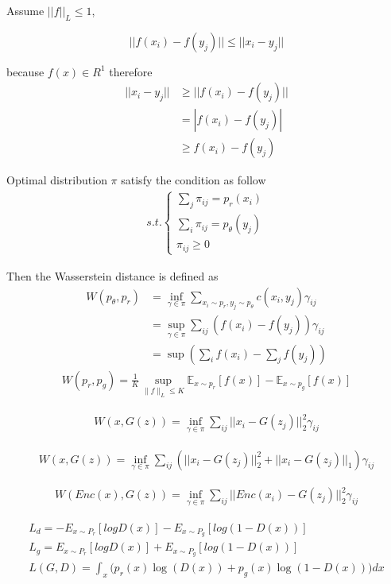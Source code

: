 \documentclass[letterpaper]{article} %
\begin{document}
	Assume $||f||_L \le 1 $,
	
	$$||f(x_i) - f(y_j)|| \le ||x_i-y_j||$$
	
	because $f(x) \in R^1$
	therefore
	\begin{align*}
	||x_i-y_j|| &\ge ||f(x_i) - f(y_j)|| \\
	&= |f(x_i)-f(y_j)| \\
	& \ge f(x_i) - f(y_j)
	\end{align*}
	
	Optimal distribution $\pi$ satisfy the condition as follow
	\begin{align*}
	s.t.
	\begin{cases}
	\sum_j\pi_{ij} = p_r(x_i) \\
	\sum_i\pi_{ij} = p_\theta(y_j) \\
	\pi_{ij} \ge 0
	\end{cases}
	\end{align*}
	
	Then the Wasserstein distance is defined as
	\begin{align*}
	W(p_\theta,p_r) &= \inf_{\gamma\in \pi} \sum_{x_i\sim p_r,y_j\sim p_\theta} c(x_i,y_j)\gamma_{ij} \\
	&=\sup_{\gamma\in \pi} \sum_{ij} (f(x_i) - f(y_j))\gamma_{ij}\\
	&=\sup (\sum_if(x_i) - \sum_jf(y_j))
	\end{align*}
	\begin{align*}
	W(p_r, p_g) = \frac{1}{K} \sup_{\| f \|_L \leq K} \mathbb{E}_{x \sim p_r}[f(x)] - \mathbb{E}_{x \sim p_g}[f(x)]
	\end{align*}
	
	
	\begin{align*}
	W(x,G(z)) = \inf_{\gamma\in \pi}\sum_{ij}||x_i-G(z_j)||^2_2\gamma_{ij}
	\end{align*}
	
	\begin{align*}
	W(x,G(z)) = \inf_{\gamma\in \pi}\sum_{ij}(||x_i-G(z_j)||^2_2 + ||x_i-G(z_j)||_1)\gamma_{ij}
	\end{align*}	
	
	
	\begin{align*}
	W(Enc(x),G(z)) = \inf_{\gamma\in \pi}\sum_{ij}||Enc(x_i)-G(z_j)||^2_2\gamma_{ij}
	\end{align*}
	
	
	\begin{align*}
	L_d = -E_{x\sim P_r}[logD(x)]-E_{x\sim P_g}[log(1-D(x))] \\
	L_g = E_{x\sim P_r}[logD(x)]+E_{x\sim P_g}[log(1-D(x))]	\\
	L(G, D) = \int_x \bigg( p_{r}(x) \log(D(x)) + p_g (x) \log(1 - D(x)) \bigg) dx\\
	\end{align*}
	
\end{document}
